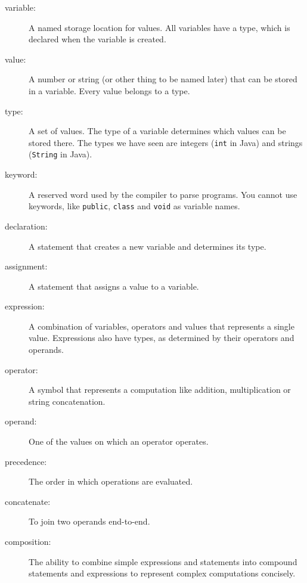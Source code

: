 \documentclass[12pt]{book}
\theoremstyle{exercise}
\begin{document}
\begin{description}

\item[variable:] A named storage location for values.  All
variables have a type, which is declared when the variable
is created.

\item[value:] A number or string (or other thing to be named later)
that can be stored in a variable.  Every value belongs to a type.

\item[type:] A set of values.  The type of a variable
determines which values can be stored there.  The types
we have seen are integers ({\tt int} in Java) and strings
({\tt String} in Java).

\item[keyword:]  A reserved word used by the compiler
to parse programs.  You cannot use keywords, like {\tt public},
{\tt class} and {\tt void} as variable names.

\item[declaration:] A statement that creates a new variable and
determines its type.

\item[assignment:] A statement that assigns a value to a variable.

\item[expression:] A combination of variables, operators and
values that represents a single value.  Expressions also
have types, as determined by their operators and operands.

\item[operator:] A symbol that represents a
computation like addition, multiplication or string
concatenation.

\item[operand:] One of the values on which an operator operates.

\item[precedence:] The order in which operations are evaluated.

\item[concatenate:] To join two operands end-to-end.

\item[composition:] The ability to combine simple
expressions and statements into compound statements and expressions
to represent complex computations concisely.


\end{description}
\end{document}
